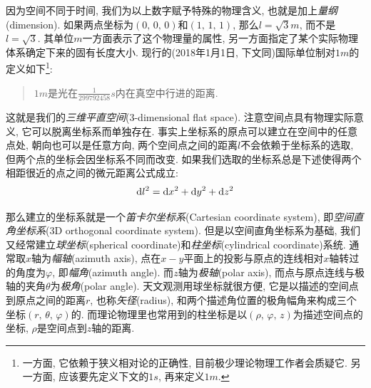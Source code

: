 因为空间不同于时间, 我们为以上数字赋予特殊的物理含义, 也就是加上\emph{量纲}(dimension). 如果两点坐标为$(0,\,0,\,0)$和$(1,\,1,\,1)$, 那么$l= \si{\sqrt{3}m}$, 而不是$l=\sqrt{3}$. 其单位$\si{m}$一方面表示了这个物理量的属性, 另一方面指定了某个实际物理体系确定下来的固有长度大小. 现行的(2018年1月1日, 下文同)国际单位制对$\si{1m}$的定义如下\footnote{一方面, 它依赖于狭义相对论的正确性, 目前极少理论物理工作者会质疑它. 另一方面, 应该要先定义下文的$\si{1s}$, 再来定义$\si{1m}$.}:
\begin{verse}\sf\large
$\si{1m}$是光在$\si{\frac{1}{299792458}s}$内在真空中行进的距离.
\end{verse}


这就是我们的\emph{三维平直空间}(3-dimensional flat space). 注意空间点具有物理实际意义, 它可以脱离坐标系而单独存在. 事实上坐标系的原点可以建立在空间中的任意点处, 朝向也可以是任意方向, 两个空间点之间的距离$l$不会依赖于坐标系的选取, 但两个点的坐标会因坐标系不同而改变. 如果我们选取的坐标系总是下述使得两个相距很近的点之间的微元距离公式成立:
\[\textrm{d} l^2=\textrm{d} x^2+\textrm{d} y^2+\textrm{d} z^2\]


那么建立的坐标系就是一个\emph{笛卡尔坐标系}(Cartesian coordinate system), 即\emph{空间直角坐标系}(3D orthogonal coordinate system). 但是以空间直角坐标系为基础, 我们又经常建立\emph{球坐标}(spherical coordinate)和\emph{柱坐标}(cylindrical coordinate)系统. 通常取$x$轴为\emph{幅轴}(azimuth axis), 点在$x-y$平面上的投影与原点的连线相对$x$轴转过的角度为$\varphi$, 即\emph{幅角}(azimuth angle). 而$z$轴为\emph{极轴}(polar axis), 而点与原点连线与极轴的夹角$\theta$为\emph{极角}(polar angle). 天文观测用球坐标就很方便, 它是以描述的空间点到原点之间的距离$r$, 也称\emph{矢径}(radius), 和两个描述角位置的极角幅角来构成三个坐标$(r,\,\theta,\,\varphi)$的. 而理论物理里也常用到的柱坐标是以$(\rho,\,\varphi,\,z)$为描述空间点的坐标, $\rho$是空间点到$z$轴的距离.

